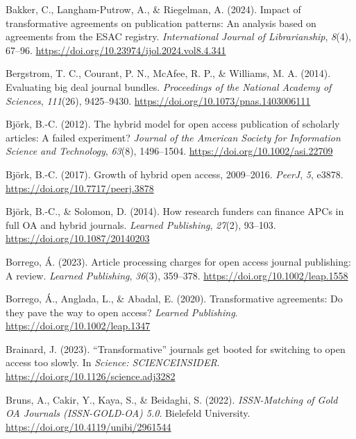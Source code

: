 \documentclass[a4paper,man,floatsintext,longtable,noextraspace,12pt]{apa6}
\newenvironment{CSLReferences}%
  {}%
  {\par}
\begin{document}
\hypertarget{refs}{}
\begin{CSLReferences}{1}{0}
\leavevmode{}%
Bakker, C., Langham-Putrow, A., \& Riegelman, A. (2024). Impact of
transformative agreements on publication patterns: An analysis based on
agreements from the ESAC registry. \emph{International Journal of
Librarianship}, \emph{8}(4), 67--96.
\url{https://doi.org/10.23974/ijol.2024.vol8.4.341}

\leavevmode{}%
Bergstrom, T. C., Courant, P. N., McAfee, R. P., \& Williams, M. A.
(2014). Evaluating big deal journal bundles. \emph{Proceedings of the
National Academy of Sciences}, \emph{111}(26), 9425--9430.
\url{https://doi.org/10.1073/pnas.1403006111}

\leavevmode{}%
Björk, B.-C. (2012). The hybrid model for open access publication of
scholarly articles: A failed experiment? \emph{Journal of the American
Society for Information Science and Technology}, \emph{63}(8),
1496--1504. \url{https://doi.org/10.1002/asi.22709}

\leavevmode{}%
Björk, B.-C. (2017). Growth of hybrid open access, 2009--2016.
\emph{PeerJ}, \emph{5}, e3878. \url{https://doi.org/10.7717/peerj.3878}

\leavevmode{}%
Björk, B.-C., \& Solomon, D. (2014). How research funders can finance
APCs in full OA and hybrid journals. \emph{Learned Publishing},
\emph{27}(2), 93--103. \url{https://doi.org/10.1087/20140203}

\leavevmode{}%
Borrego, Á. (2023). Article processing charges for open access journal
publishing: A review. \emph{Learned Publishing}, \emph{36}(3), 359--378.
\url{https://doi.org/10.1002/leap.1558}

\leavevmode{}%
Borrego, Á., Anglada, L., \& Abadal, E. (2020). Transformative
agreements: Do they pave the way to open access? \emph{Learned
Publishing}. \url{https://doi.org/10.1002/leap.1347}

\leavevmode{}%
Brainard, J. (2023). {``Transformative''} journals get booted for
switching to open access too slowly. In \emph{Science: SCIENCEINSIDER}.
\url{https://doi.org/10.1126/science.adj3282}

\leavevmode{}%
Bruns, A., Cakir, Y., Kaya, S., \& Beidaghi, S. (2022).
\emph{{ISSN-Matching of Gold OA Journals (ISSN-GOLD-OA) 5.0}}. Bielefeld
University. \url{https://doi.org/10.4119/unibi/2961544}


\end{CSLReferences}
\end{document}
